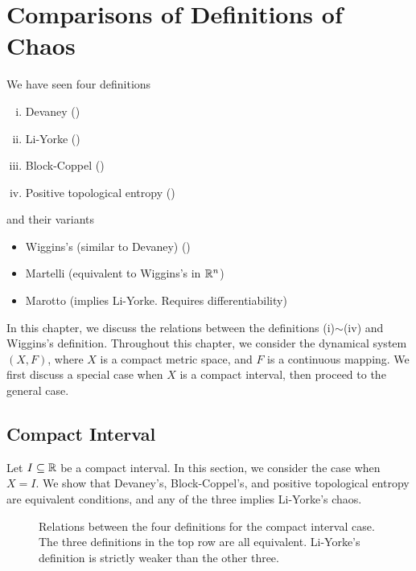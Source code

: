 \documentclass[10pt,twoside,draft]{book}
\begin{document}
\label{chap:comparison}
\chapter{Comparisons of Definitions of Chaos}
We have seen four definitions 
\begin{enumerate}[(i)]
  \item Devaney (\dev)
  \item Li-Yorke (\liy)
  \item Block-Coppel (\blcp)
  \item Positive topological entropy (\pte)
\end{enumerate}
and their variants
\begin{itemize}
  \item Wiggins's (similar to Devaney) (\wig)
  \item Martelli (equivalent to Wiggins's in $\mathbb{R}^n$)
  \item Marotto (implies Li-Yorke. Requires differentiability)
\end{itemize}
In this chapter, we discuss the relations between the definitions (i)$\sim$(iv) and Wiggins's definition.
Throughout this chapter, we consider the dynamical system $(X,F)$, where $X$ is a compact metric space, and $F$ is a continuous mapping.
We first discuss a special case when $X$ is a compact interval, then proceed to the general case.

\section{Compact Interval}
Let $I \subseteq \mathbb{R}$ be a compact interval.
In this section, we consider the case when $X = I$.
We show that Devaney's, Block-Coppel's, and positive topological entropy are equivalent conditions, and any of the three implies Li-Yorke's chaos.
\begin{figure}[ht]
  \centering
  \label{fig:chaos-interval}
  \caption{
    Relations between the four definitions for the compact interval case.
    The three definitions in the top row are all equivalent.
    Li-Yorke's definition is strictly weaker than the other three.
  }
\end{figure}
\end{document}
